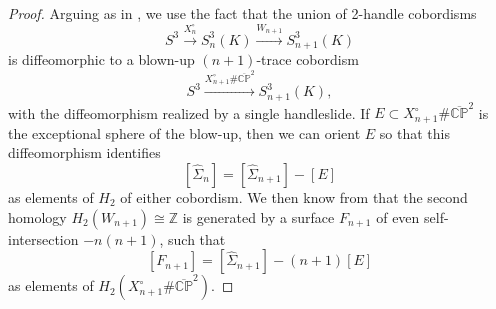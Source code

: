 \documentclass[11pt]{amsart}
\numberwithin{equation}{section}
\numberwithin{theorem}{section}
\theoremstyle{definition}
\newcommand{\Z}{\mathbb{Z}}
\newcommand{\CP}{\mathbb{CP}}
\newcommand{\cptwo}{\overline{\CP}^2}
\begin{document}
\begin{proof}
Arguing as in \cite[Proposition~7.1]{bs-lspace}, we use the fact that the union of 2-handle cobordisms
\[ S^3 \xrightarrow{X^\circ_n} S^3_n(K) \xrightarrow{W_{n+1}} S^3_{n+1}(K) \]
is diffeomorphic to a blown-up $(n+1)$-trace cobordism
\[ S^3 \xrightarrow{X^\circ_{n+1} \# \cptwo} S^3_{n+1}(K), \]
with the diffeomorphism realized by a single handleslide.  If $E \subset X^\circ_{n+1} \# \cptwo$ is the exceptional sphere of the blow-up, then we can orient $E$ so that this diffeomorphism identifies
\[ [\hat\Sigma_n] = [\hat\Sigma_{n+1}] - [E] \]
as elements of $H_2$ of either cobordism.  We then know from \cite[Lemma~7.2]{bs-lspace} that the second homology $H_2(W_{n+1}) \cong \Z$ is generated by a surface $F_{n+1}$ of even self-intersection $-n(n+1)$, such that
\[ [F_{n+1}] = [\hat\Sigma_{n+1}] - (n+1)[E] \]
as elements of $H_2(X^\circ_{n+1} \# \cptwo)$.


\end{proof}
\end{document}

